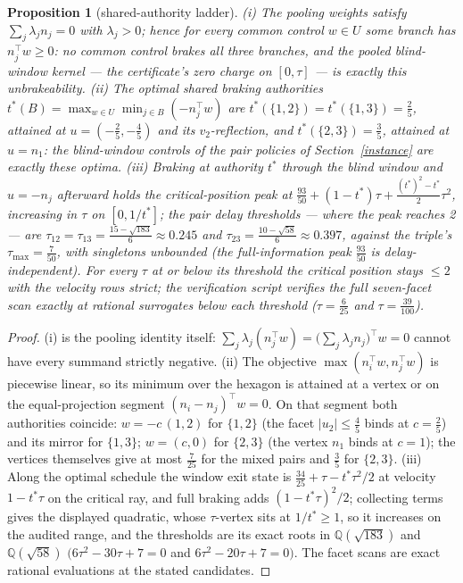 \documentclass[10pt,twocolumn]{article}
\theoremstyle{plain}
\newtheorem{proposition}[theorem]{Proposition}
\theoremstyle{definition}
\theoremstyle{remark}
\begin{document}
\begin{proposition}[shared-authority ladder]\label{prop:ladder}
\emph{(i)} The pooling weights satisfy \(\sum_j \lambda_j n_j = 0\)
with \(\lambda_j > 0\); hence for every common control \(w \in U\)
some branch has \(n_j^\top w \ge 0\): no common control brakes all
three branches, and the pooled blind-window kernel --- the certificate's
zero charge on \([0, \tau]\) --- is exactly this unbrakeability.
\emph{(ii)} The optimal shared braking authorities
\(t^{*}(B) = \max_{w \in U} \min_{j \in B}(-n_j^\top w)\) are
\(t^{*}(\{1,2\}) = t^{*}(\{1,3\}) = \tfrac25\), attained at
\(u = (-\tfrac25, -\tfrac45)\) and its \(v_2\)-reflection, and
\(t^{*}(\{2,3\}) = \tfrac35\), attained at \(u = n_1\): the
blind-window controls of the pair policies of
Section~\ref{instance} are exactly these optima. \emph{(iii)} Braking at
authority \(t^{*}\) through the blind window and \(u = -n_j\)
afterward holds the critical-position peak at
\(\tfrac{93}{50} + (1 - t^{*})\tau +
\tfrac{(t^{*})^2 - t^{*}}{2}\tau^2\), increasing in \(\tau\) on
\([0, 1/t^{*}]\); the pair delay thresholds --- where the peak reaches
2 --- are \(\tau_{12} = \tau_{13} = \tfrac{15 - \sqrt{183}}{6}
\approx 0.245\) and \(\tau_{23} = \tfrac{10 - \sqrt{58}}{6} \approx
0.397\), against the triple's \(\tau_{\max} = \tfrac7{50}\), with
singletons unbounded (the full-information peak \(\tfrac{93}{50}\) is
delay-independent). For every \(\tau\) at or below its threshold the
critical position stays \(\le 2\) with the velocity rows strict; the verification script verifies the full seven-facet scan exactly at rational
surrogates below each threshold (\(\tau = \tfrac6{25}\) and
\(\tau = \tfrac{39}{100}\)).
\end{proposition}

\begin{proof}
(i) is the pooling identity itself: \(\sum_j \lambda_j
(n_j^\top w) = \bigl(\sum_j \lambda_j n_j\bigr)^\top w = 0\)
cannot have every summand strictly negative. (ii) The objective
\(\max(n_i^\top w, n_j^\top w)\) is piecewise linear, so its
minimum over the hexagon is attained at a vertex or on the
equal-projection segment \((n_i - n_j)^\top w = 0\). On that segment
both authorities coincide: \(w = -c\,(1,2)\) for \(\{1,2\}\) (the
facet \(|u_2| \le \tfrac45\) binds at \(c = \tfrac25\)) and its
mirror for \(\{1,3\}\); \(w = (c, 0)\) for \(\{2,3\}\) (the
vertex \(n_1\) binds at \(c = 1\)); the vertices themselves give at
most \(\tfrac7{25}\) for the mixed pairs and \(\tfrac35\) for
\(\{2,3\}\). (iii) Along the optimal schedule the window exit state is
\(\tfrac{34}{25} + \tau - t^{*}\tau^2/2\) at velocity
\(1 - t^{*}\tau\) on the critical ray, and full braking adds
\((1 - t^{*}\tau)^2/2\); collecting terms gives the displayed
quadratic, whose \(\tau\)-vertex sits at \(1/t^{*} \ge 1\), so it
increases on the audited range, and the thresholds are its exact roots
in \(\mathbb{Q}(\sqrt{183})\) and \(\mathbb{Q}(\sqrt{58})\)
\(\bigl(6\tau^2 - 30\tau + 7 = 0\) and \(6\tau^2 - 20\tau + 7 =
0\bigr)\). The facet scans are exact rational evaluations at the stated
candidates.
\end{proof}
\end{document}
